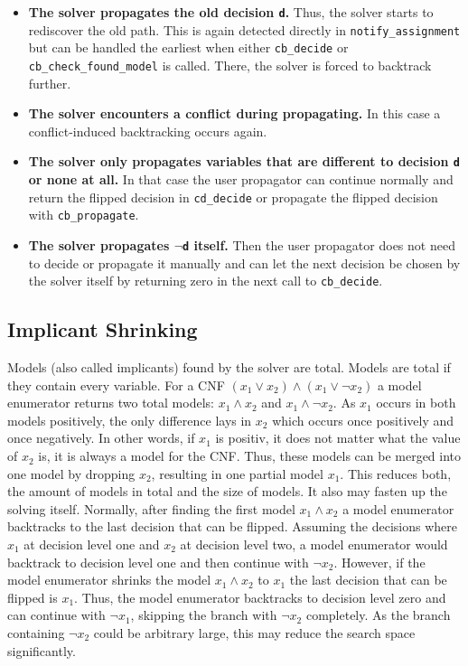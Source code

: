 \documentclass[12pt,a4paper]{article}
\begin{document}
\begin{itemize}
  
\item \textbf{The solver propagates the old decision \texttt{d}.} Thus, the solver starts to rediscover the old path. This is again detected directly in \verb|notify_assignment| but can be handled the earliest when either \verb|cb_decide| or \verb|cb_check_found_model| is called. There, the solver is forced to backtrack further.

\item \textbf{The solver encounters a conflict during propagating.} In this case a conflict-induced backtracking occurs again.

\item \textbf{The solver only propagates variables that are different to decision \texttt{d} or none at all.} In that case the user propagator can continue normally and return the flipped decision in \verb|cd_decide| or propagate the flipped decision with \verb|cb_propagate|.

\item \textbf{The solver propagates \texttt{$\lnot$d} itself.} Then the user propagator does not need to decide or propagate it manually and can let the next decision be chosen by the solver itself by returning zero in the next call to \verb|cb_decide|.

\end{itemize}

\subsection{Implicant Shrinking}
\label{sec:implicant_shrinking}
Models (also called implicants) found by the solver are total. Models are total if they contain every variable. For a CNF \((x_1 \lor x_2) \land (x_1 \lor \lnot x_2) \) a model enumerator returns two total models: \(x_1 \land x_2\) and \(x_1 \land \lnot x_2\). As \(x_1\) occurs in both models positively, the only difference lays in \(x_2\) which occurs once positively and once negatively. In other words, if \(x_1\) is positiv, it does not matter what the value of \(x_2\) is, it is always a model for the CNF. Thus, these models can be merged into one model by dropping \(x_2\), resulting in one partial model \(x_1\). This reduces both, the amount of models in total and the size of models. It also may fasten up the solving itself. Normally, after finding the first model \(x_1 \land x_2\) a model enumerator backtracks to the last decision that can be flipped. Assuming the decisions where \(x_1\) at decision level one and \(x_2\) at decision level two, a model enumerator would backtrack to decision level one and then continue with \(\lnot x_2\). However, if the model enumerator shrinks the model \(x_1 \land x_2\) to \(x_1\) the last decision that can be flipped is \(x_1\). Thus, the model enumerator backtracks to decision level zero and can continue with \(\lnot x_1\), skipping the branch with \(\lnot x_2\) completely. As the branch containing \(\lnot x_2\) could be arbitrary large, this may reduce the search space significantly.
\end{document}
